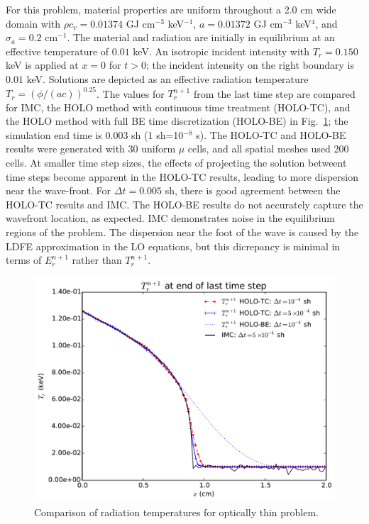 \documentclass{anstrans}
\newcommand{\invcm}[0]{cm$^{-1}$}
\begin{document}
For this problem, material properties
are uniform throughout a 2.0 cm wide domain with $\rho c_v = 0.01374$ GJ cm$^{-3}$
keV$^{-1}$, $a=0.01372$ GJ cm$^{-3}$ keV$^{4}$, and $\sigma_a=0.2$ \invcm.  
The material and radiation are initially in equilibrium at an effective temperature of $0.01$ keV.
An isotropic incident intensity with $T_r = 0.150$ keV is applied
at $x=0$ for $t>0$; the incident intensity on the right boundary is $0.01$ keV.
 Solutions are depicted as an effective radiation temperature
 $T_r=\left(\phi/(ac)\right)^{0.25}$. The values for $T_r^{n+1}$ from the last
 time step are compared for IMC, the HOLO method with continuous time treatment (HOLO-TC), and
 the HOLO method with full BE time discretization (HOLO-BE) in
 Fig.~\ref{fig:thin_temp_compare}; the simulation end time is 0.003 sh (1 sh=10$^{-8}$ s). The HOLO-TC and HOLO-BE results were generated with 30
uniform $\mu$ cells, and all spatial meshes used 200 cells.  At smaller time step sizes, the
effects of projecting the solution betweent time steps become apparent in the HOLO-TC results, leading to more
dispersion near the wave-front.  For $\Delta t=0.005$ sh, there is good agreement between
the HOLO-TC results and IMC.  The HOLO-BE results do not accurately capture
the wavefront location, as expected. IMC demonstrates noise in the equilibrium
regions of the problem. The dispersion near the foot of the wave is caused by
the LDFE approximation in the LO equations, but this dicrepancy is minimal in
terms of $E_r^{n+1}$ rather than $T_r^{n+1}$.
\begin{figure}
  \centering
    \includegraphics[width=0.92\linewidth]{thin_temp_compare.pdf}
    \caption{\label{fig:thin_temp_compare} Comparison of radiation temperatures for optically thin
        problem. }
\end{figure}
\end{document}

